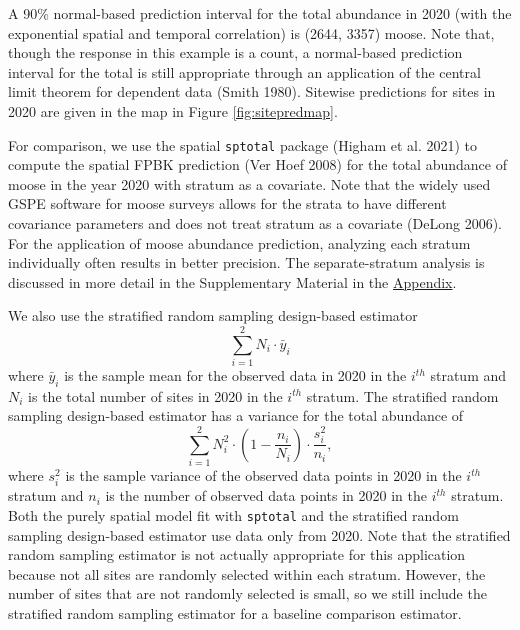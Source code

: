 \documentclass[smallextended]{svjour3}       %
\begin{document}
A 90\% normal-based prediction interval for the total abundance in 2020
(with the exponential spatial and temporal correlation) is (2644, 3357)
moose. Note that, though the response in this example is a count, a
normal-based prediction interval for the total is still appropriate
through an application of the central limit theorem for dependent data
(Smith 1980). Sitewise predictions for sites in 2020 are given in the
map in Figure \ref{fig:sitepredmap}.

For comparison, we use the spatial \texttt{sptotal} package (Higham et
al. 2021) to compute the spatial FPBK prediction (Ver Hoef 2008) for the
total abundance of moose in the year 2020 with stratum as a covariate.
Note that the widely used GSPE software for moose surveys allows for the
strata to have different covariance parameters and does not treat
stratum as a covariate (DeLong 2006). For the application of moose
abundance prediction, analyzing each stratum individually often results
in better precision. The separate-stratum analysis is discussed in more
detail in the Supplementary Material in the
\protect\hyperlink{appendix}{Appendix}.

We also use the stratified random sampling design-based estimator
\mbox{} \begin{equation*}
\sum_{i = 1}^{2} N_i \cdot \bar{y}_i
\end{equation*} \noindent where \(\bar{y}_i\) is the sample mean for the
observed data in 2020 in the \(i^{th}\) stratum and \(N_i\) is the total
number of sites in 2020 in the \(i^{th}\) stratum. The stratified random
sampling design-based estimator has a variance for the total abundance
of \mbox{} \begin{equation*}
\sum_{i = 1}^{2} N_i^2 \cdot \left(1 - \frac{n_i}{N_i}\right) \cdot \frac{s^2_i}{n_i},
\end{equation*} \noindent where \(s^2_i\) is the sample variance of the
observed data points in 2020 in the \(i^{th}\) stratum and \(n_i\) is
the number of observed data points in 2020 in the \(i^{th}\) stratum.
Both the purely spatial model fit with \texttt{sptotal} and the
stratified random sampling design-based estimator use data only from
2020. Note that the stratified random sampling estimator is not actually
appropriate for this application because not all sites are randomly
selected within each stratum. However, the number of sites that are not
randomly selected is small, so we still include the stratified random
sampling estimator for a baseline comparison estimator.
\end{document}

